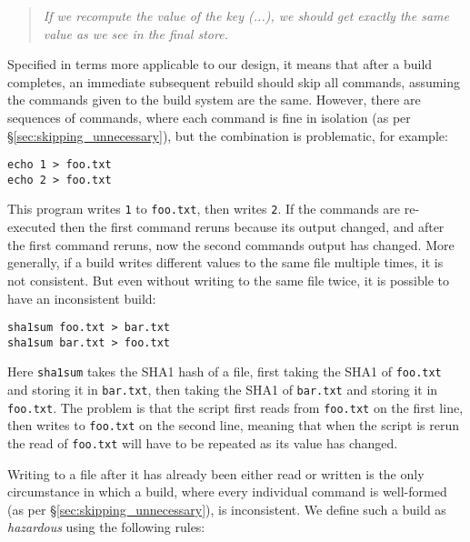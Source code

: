 \begin{quote}
\emph{If we recompute the value of the key (...), we should get exactly the same value as we see in the final store.}
\end{quote}

Specified in terms more applicable to our design, it means that after a build completes, an immediate subsequent rebuild should skip all commands, assuming the commands given to the build system are the same. However, there are sequences of commands, where each command is fine in isolation (as per \S\ref{sec:skipping_unnecessary}), but the combination is problematic, for example:

\vspace{1mm}
\begin{verbatim}
echo 1 > foo.txt
echo 2 > foo.txt
\end{verbatim}
\vspace{1mm}

This program writes \texttt{1} to \texttt{foo.txt}, then writes \texttt{2}. If the commands are re-executed then the first command reruns because its output changed, and after the first command reruns, now the second commands output has changed. More generally, if a build writes different values to the same file multiple times, it is not consistent. But even without writing to the same file twice, it is possible to have an inconsistent build:

\vspace{1mm}
\begin{verbatim}
sha1sum foo.txt > bar.txt
sha1sum bar.txt > foo.txt
\end{verbatim}
\vspace{1mm}

Here \texttt{sha1sum} takes the SHA1 hash of a file, first taking the SHA1 of \texttt{foo.txt} and storing it in \texttt{bar.txt}, then taking the SHA1 of \texttt{bar.txt} and storing it in \texttt{foo.txt}. The problem is that the script first reads from \texttt{foo.txt} on the first line, then writes to \texttt{foo.txt} on the second line, meaning that when the script is rerun the read of \texttt{foo.txt} will have to be repeated as its value has changed.

Writing to a file after it has already been either read or written is the only circumstance in which a build, where every individual command is well-formed (as per \S\ref{sec:skipping_unnecessary}), is inconsistent. We define such a build as \emph{hazardous} using the following rules:

